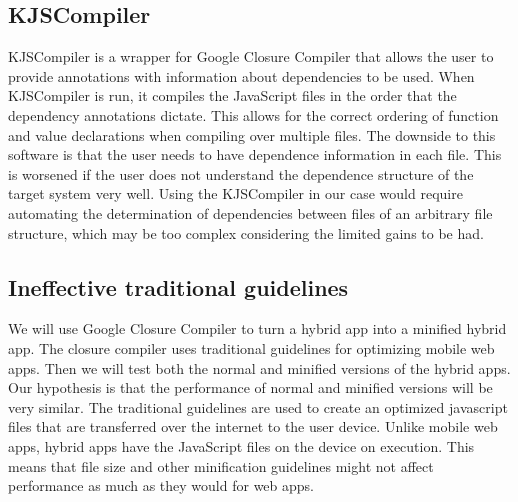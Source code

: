 \documentclass{acm_proc_article-sp}
\begin{document}
\subsection{KJSCompiler}
KJSCompiler is a wrapper for Google Closure Compiler that allows the user to provide annotations with information about dependencies to be used.
When KJSCompiler is run, it compiles the JavaScript files in the order that the dependency annotations dictate.
This allows for the correct ordering of function and value declarations when compiling over multiple files.
The downside to this software is that the user needs to have dependence information in each file. 
This is worsened if the user does not understand the dependence structure of the target system very well. 
Using the KJSCompiler in our case would require automating the determination of dependencies between files of an arbitrary file structure, which may be too complex considering the limited gains to be had.


\subsection{Ineffective traditional guidelines}
We will use Google Closure Compiler to turn a hybrid app into a minified hybrid app.
The closure compiler uses traditional guidelines for optimizing mobile web apps.
Then we will test both the normal and minified versions of the hybrid apps.
Our hypothesis is that the performance of normal and minified versions will be very similar.
The traditional guidelines are used to create an optimized javascript files that are transferred over the internet to the user device.
Unlike mobile web apps, hybrid apps have the JavaScript files on the device on execution.
This means that file size and other minification guidelines might not affect performance as much as they would for web apps.
\end{document}

